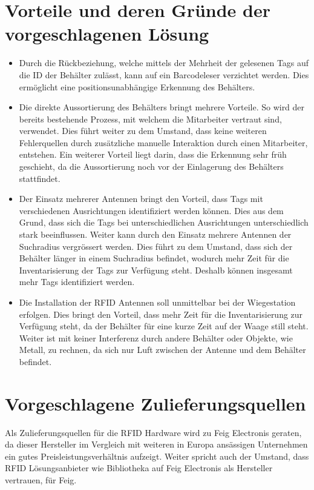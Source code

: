\section{Vorteile und deren Gründe der vorgeschlagenen Lösung}
\begin{itemize}
	\item Durch die Rückbeziehung, welche mittels der Mehrheit der gelesenen Tags auf die ID der Behälter zulässt, kann auf ein Barcodeleser verzichtet werden. Dies ermöglicht eine positionsunabhängige Erkennung des Behälters.
	\item Die direkte Aussortierung des Behälters bringt mehrere Vorteile. So wird der bereits bestehende Prozess, mit welchem die Mitarbeiter vertraut sind, verwendet. Dies führt weiter zu dem Umstand, dass keine weiteren Fehlerquellen durch zusätzliche manuelle Interaktion durch einen Mitarbeiter, entstehen. Ein weiterer Vorteil liegt darin, dass die Erkennung sehr früh geschieht, da die Aussortierung noch vor der Einlagerung des Behälters stattfindet.
	\item Der Einsatz mehrerer Antennen bringt den Vorteil, dass Tags mit verschiedenen Ausrichtungen identifiziert werden können. Dies aus dem Grund, dass sich die Tags bei unterschiedlichen Ausrichtungen unterschiedlich stark beeinflussen. Weiter kann durch den Einsatz mehrere Antennen der Suchradius vergrössert werden. Dies führt zu dem Umstand, dass sich der Behälter länger in einem Suchradius befindet, wodurch mehr Zeit für die Inventarisierung der Tags zur Verfügung steht. Deshalb können insgesamt mehr Tags identifiziert werden.
	\item Die Installation der RFID Antennen soll unmittelbar bei der Wiegestation erfolgen. Dies bringt den Vorteil, dass mehr Zeit für die Inventarisierung zur Verfügung steht, da der Behälter für eine kurze Zeit auf der Waage still steht. Weiter ist mit keiner Interferenz durch andere Behälter oder Objekte, wie Metall, zu rechnen, da sich nur Luft zwischen der Antenne und dem Behälter befindet.
\end{itemize}


\section{Vorgeschlagene Zulieferungsquellen}
Als Zulieferungsquellen für die RFID Hardware wird zu Feig Electronis geraten, da dieser Hersteller im Vergleich mit weiteren in Europa ansässigen Unternehmen ein gutes Preisleistungsverhältnis aufzeigt. Weiter spricht auch der Umstand, dass RFID Lösungsanbieter wie Bibliotheka auf Feig Electronis als Hersteller vertrauen, für Feig.

